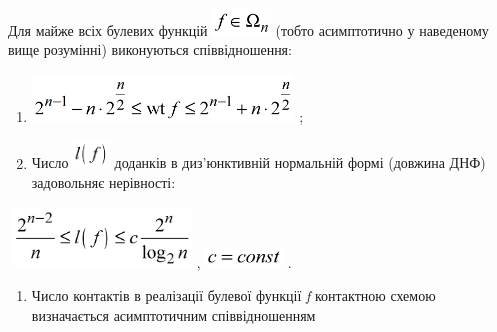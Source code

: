 {{{{{{{{{{{{{{{{{{\begin{definition}
{{Для майже всіх булевих функцій 
\includegraphics[width=0.611in,height=0.2874in]{crypt-img/crypt-img171.png} 
(тобто асимптотично у наведеному вище розумінні) виконуються співвідношення:

\liststyleWWviiiNumvi
\begin{enumerate}
\item 
\includegraphics[width=2.7366in,height=0.5008in]{crypt-img/crypt-img172.png} ;
\item Число 
\includegraphics[width=0.3819in,height=0.2945in]{crypt-img/crypt-img173.png} 
доданків в диз'юнктивній нормальній формі (довжина ДНФ)
задовольняє нерівності:
\end{enumerate}
$$ \includegraphics[width=1.8701in,height=0.6311in]{crypt-img/crypt-img174.png} , 
\includegraphics[width=0.8083in,height=0.2071in]{crypt-img/crypt-img175.png} .
\par}

\liststyleWWviiiNumvi
\setcounter{saveenum}{\value{enumi}}
\begin{enumerate}
\setcounter{enumi}{\value{saveenum}}
\item Число контактів в реалізації булевої функції \textit{f }контактною схемою
визначається асимптотичним співвідношенням
\end{enumerate}
$$

}
\end{definition}}}}}}}}}}}}}}}}}}}
